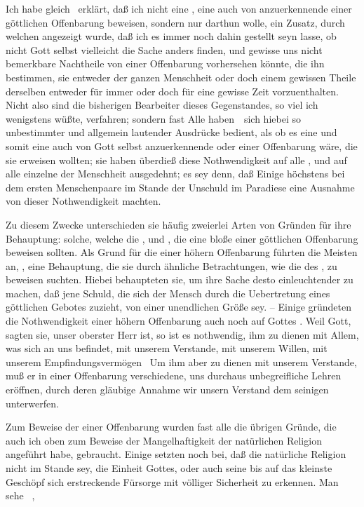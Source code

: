 Ich habe gleich \ erklärt, daß ich nicht eine , eine auch von  anzuerkennende  einer göttlichen Offenbarung beweisen, sondern nur darthun wolle,  ein Zusatz, durch welchen angezeigt wurde, daß ich es immer noch dahin gestellt seyn lasse, ob nicht Gott selbst vielleicht die Sache anders finden, und gewisse uns nicht bemerkbare Nachtheile von einer Offenbarung vorhersehen könnte, die ihn bestimmen, sie entweder der ganzen Menschheit oder doch einem gewissen Theile derselben entweder für immer oder doch für eine gewisse Zeit vorzuenthalten. Nicht also sind die bisherigen Bearbeiter dieses Gegenstandes, so viel ich wenigstens wüßte, verfahren; sondern fast Alle haben~\ sich hiebei so unbestimmter und allgemein lautender Ausdrücke bedient, als ob es eine  und somit eine auch von Gott selbst anzuerkennende  oder  einer Offenbarung wäre, die sie erweisen wollten; sie haben überdieß diese Nothwendigkeit auf alle , und auf alle einzelne  der Menschheit ausgedehnt; es sey denn, daß Einige höchstens bei dem ersten Menschenpaare im Stande der Unschuld im Paradiese eine Ausnahme von dieser Nothwendigkeit machten.\par
Zu diesem Zwecke unterschieden sie häufig zweierlei Arten von Gründen für ihre Behauptung: solche, welche die , und , die eine bloße  einer göttlichen Offenbarung beweisen sollten. Als Grund für die  einer höhern Offenbarung führten die Meisten an, , eine Behauptung, die sie durch ähnliche Betrachtungen, wie die des , zu beweisen suchten. Hiebei behaupteten sie, um ihre Sache desto einleuchtender zu machen, daß jene Schuld, die sich der Mensch durch die Uebertretung eines göttlichen Gebotes zuzieht, von einer unendlichen Größe sey. -- Einige gründeten die Nothwendigkeit einer höhern Offenbarung auch noch auf Gottes . Weil Gott, sagten sie, unser oberster Herr ist, so ist es nothwendig, ihm zu dienen mit Allem, was sich an uns befindet, mit unserem Verstande, mit unserem Willen, mit unserem Empfindungsvermögen \usw\ Um ihm aber zu dienen mit unserem Verstande, muß er in einer Offenbarung verschiedene, uns durchaus unbegreifliche Lehren eröffnen, durch deren gläubige Annahme wir unsern Verstand dem seinigen unterwerfen.\par
Zum Beweise der  einer Offenbarung wurden fast alle die übrigen Gründe, die auch ich oben zum Beweise der Mangelhaftigkeit der natürlichen Religion angeführt habe, gebraucht. Einige setzten noch bei, daß die natürliche Religion nicht im Stande sey, die Einheit Gottes, oder auch seine bis auf das kleinste Geschöpf sich erstreckende Fürsorge mit völliger Sicherheit zu erkennen. Man sehe \zB\ , \uA ~
   
